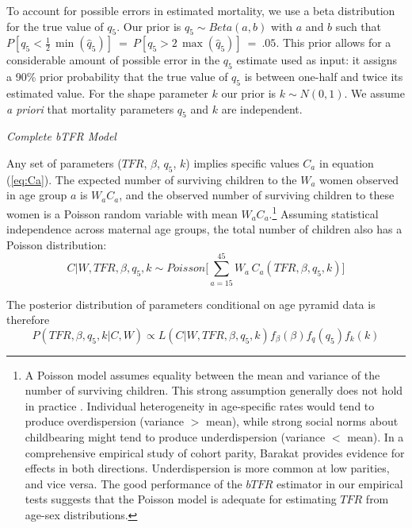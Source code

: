 \documentclass[12pt]{article}
\begin{document}
To account for possible errors in estimated mortality, we use a beta
distribution for the true value of \(q_5\). Our prior is
\(q_5 \sim Beta(a,b)\) with \(a\) and \(b\) such that
\(P[q_{5}<\tfrac{1}{2}\,\min(\hat{q}_{5})]\:=\: P[q_{5}>2\,\max(\hat{q}_{5})]\:=\:.05\).
This prior allows for a considerable amount of possible error in the
\(q_5\) estimate used as input: it assigns a 90\% prior probability that
the true value of \(q_5\) is between one-half and twice its estimated
value. For the shape parameter \(k\) our prior is \(k \sim N(0,1)\). We
assume \emph{a priori} that mortality parameters \(q_5\) and \(k\) are
independent.

\emph{Complete bTFR Model}

Any set of parameters (\(TFR\), \(\beta\), \(q_5\), \(k\)) implies
specific values \(C_a\) in equation (\ref{eq:Ca}). The expected number
of surviving children to the \(W_{a}\) women observed in age group \(a\)
is \(W_{a}C_{a}\), and the observed number of surviving children to
these women is a Poisson random variable with mean
\(W_{a}C_{a}.\)\footnote{A Poisson model assumes equality between the mean and variance of the number of surviving children. This strong assumption generally does not hold in practice \cite[e.g.~][Figure 1]{Barakat_36_26}. Individual heterogeneity in age-specific rates would tend to produce overdispersion (variance $>$ mean), while strong social norms about childbearing might tend to produce underdispersion (variance $<$ mean). In a comprehensive empirical study of cohort parity, Barakat \citeyear{bilal_barakat_revisiting_2014} provides evidence for effects in both directions. Underdispersion is more common at low parities, and vice versa. The good performance of the $bTFR$ estimator in our empirical tests suggests that the Poisson model is adequate for estimating $TFR$ from age-sex distributions.}
Assuming statistical independence across maternal age groups, the total
number of children also has a Poisson distribution: \begin{equation}
C|W,TFR,\beta,q_5,k \sim Poisson \Bigg[ \sum_{a=15}^{45}W_a\, C_a(TFR,\beta,q_5,k) \Bigg] \label{eq:poisson distribution of C}
\end{equation}

The posterior distribution of parameters conditional on age pyramid data
is therefore \begin{equation}
P(TFR,\beta, q_5,k | C,W) \propto L(C|W,TFR,\beta,q_5,k) f_\beta(\beta)f_q(q_5)f_k(k)  \label{eq:joint posterior}
\end{equation}
\end{document}
